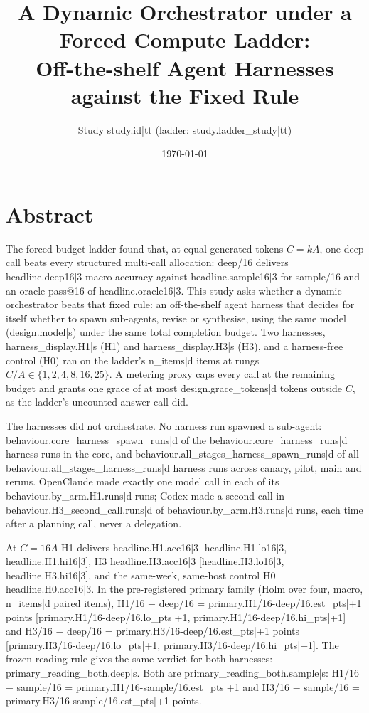 \documentclass[11pt]{article}
\title{\vspace{-2em}A Dynamic Orchestrator under a Forced Compute Ladder:\\
Off-the-shelf Agent Harnesses against the Fixed Rule}
\author{Study {{study.id|tt}} (ladder: {{study.ladder_study|tt}})}
\date{\today}
\begin{document}
\maketitle
\vspace{-1.5em}

\section*{Abstract}

The forced-budget ladder found that, at equal generated tokens $C = kA$, one deep call beats every structured
multi-call allocation: deep/16 delivers {{headline.deep16|3}} macro accuracy against {{headline.sample16|3}} for
sample/16 and an oracle pass@16 of {{headline.oracle16|3}}. This study asks whether a dynamic orchestrator beats
that fixed rule: an off-the-shelf agent harness that decides for itself whether to spawn sub-agents, revise or
synthesise, using the same model ({{design.model|s}}) under the same total completion budget. Two harnesses,
{{harness_display.H1|s}} (H1) and {{harness_display.H3|s}} (H3), and a harness-free control (H0) ran on the
ladder's {{n_items|d}} items at rungs $C/A \in \{1, 2, 4, 8, 16, 25\}$. A metering proxy caps every call at the
remaining budget and grants one grace of at most {{design.grace_tokens|d}} tokens outside $C$, as the ladder's
uncounted answer call did.

The harnesses did not orchestrate. No harness run spawned a sub-agent: {{behaviour.core_harness_spawn_runs|d}} of the {{behaviour.core_harness_runs|d}}
harness runs in the core, and {{behaviour.all_stages_harness_spawn_runs|d}} of all {{behaviour.all_stages_harness_runs|d}} harness runs across canary, pilot,
main and reruns. OpenClaude made exactly one model call in each of its {{behaviour.by_arm.H1.runs|d}} runs; Codex
made a second call in {{behaviour.H3_second_call.runs|d}} of {{behaviour.by_arm.H3.runs|d}} runs, each time after
a planning call, never a delegation.

At $C = 16A$ H1 delivers {{headline.H1.acc16|3}} [{{headline.H1.lo16|3}}, {{headline.H1.hi16|3}}], H3
{{headline.H3.acc16|3}} [{{headline.H3.lo16|3}}, {{headline.H3.hi16|3}}], and the same-week, same-host control H0
{{headline.H0.acc16|3}}. In the pre-registered primary family (Holm over four, macro, {{n_items|d}} paired items),
H1/16 $-$ deep/16 = {{primary.H1/16-deep/16.est_pts|+1}} points [{{primary.H1/16-deep/16.lo_pts|+1}},
{{primary.H1/16-deep/16.hi_pts|+1}}] and H3/16 $-$ deep/16 = {{primary.H3/16-deep/16.est_pts|+1}} points
[{{primary.H3/16-deep/16.lo_pts|+1}}, {{primary.H3/16-deep/16.hi_pts|+1}}]. The frozen reading rule gives the
same verdict for both harnesses: {{primary_reading_both.deep|s}}. Both are {{primary_reading_both.sample|s}}:
H1/16 $-$ sample/16 = {{primary.H1/16-sample/16.est_pts|+1}} and H3/16 $-$ sample/16 =
{{primary.H3/16-sample/16.est_pts|+1}} points.
\end{document}
